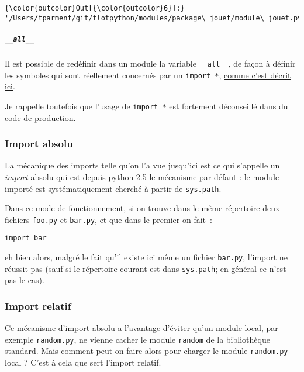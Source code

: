 \begin{Verbatim}[commandchars=\\\{\}]
{\color{outcolor}Out[{\color{outcolor}6}]:} '/Users/tparment/git/flotpython/modules/package\_jouet/module\_jouet.py'
\end{Verbatim}
            
    \hypertarget{all__}{%
\subparagraph{\texorpdfstring{\texttt{\_\_all\_\_}}{\_\_all\_\_}}\label{all__}}

    Il est possible de redéfinir dans un module la variable
\texttt{\_\_all\_\_}, de façon à définir les symboles qui sont
réellement concernés par un \texttt{import\ *},
\href{https://docs.python.org/3/tutorial/modules.html\#importing-from-a-package}{comme
c'est décrit ici}.

Je rappelle toutefois que l'usage de \texttt{import\ *} est fortement
déconseillé dans du code de production.

    \hypertarget{import-absolu}{%
\subsubsection{Import absolu}\label{import-absolu}}

    La mécanique des imports telle qu'on l'a vue jusqu'ici est ce qui
s'appelle un \emph{import} absolu qui est depuis python-2.5 le mécanisme
par défaut : le module importé est systématiquement cherché à partir de
\texttt{sys.path}.

Dans ce mode de fonctionnement, si on trouve dans le même répertoire
deux fichiers \texttt{foo.py} et \texttt{bar.py}, et que dans le premier
on fait~:

\begin{verbatim}
import bar
\end{verbatim}

eh bien alors, malgré le fait qu'il existe ici même un fichier
\texttt{bar.py}, l'import ne réussit pas (sauf si le répertoire courant
est dans \texttt{sys.path}; en général ce n'est pas le cas).

    \hypertarget{import-relatif}{%
\subsubsection{Import relatif}\label{import-relatif}}

    Ce mécanisme d'import absolu a l'avantage d'éviter qu'un module local,
par exemple \texttt{random.py}, ne vienne cacher le module
\texttt{random} de la bibliothèque standard. Mais comment peut-on faire
alors pour charger le module \texttt{random.py} local ? C'est à cela que
sert l'import relatif.

